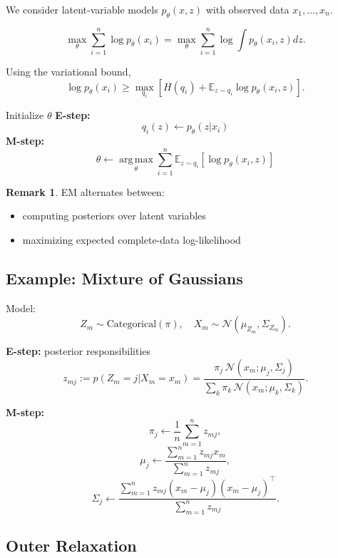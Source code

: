 \documentclass[12pt,oneside]{book}
\numberwithin{equation}{section}
\theoremstyle{definition}
\newtheorem{remark}{Remark}[section]
\theoremstyle{plain}
\theoremstyle{remark}
\newcommand{\E}{\mathbb{E}}
\newcommand{\argmax}{\operatorname*{arg\,max}}
\newcommand{\Normal}{\mathcal{N}}
\begin{document}
We consider latent-variable models $p_\theta(x,z)$ with observed data $x_1,\dots,x_n$.

\[
\max_\theta \sum_{i=1}^n \log p_\theta(x_i)
=
\max_\theta \sum_{i=1}^n \log \int p_\theta(x_i,z) dz.
\]

Using the variational bound,
\[
\log p_\theta(x_i)
\ge
\max_{q_i} \left[ H(q_i) + \E_{z \sim q_i} \log p_\theta(x_i,z) \right].
\]

\begin{algorithm}[H]
\caption{Expectation Maximization (EM)}
\begin{algorithmic}[1]
\State Initialize $\theta$
\Repeat
\State \textbf{E-step:} 
\[
q_i(z) \leftarrow p_\theta(z|x_i)
\]
\State \textbf{M-step:}
\[
\theta \leftarrow \argmax_\theta \sum_{i=1}^n \E_{z \sim q_i}[\log p_\theta(x_i,z)]
\]
\end{algorithmic}
\end{algorithm}

\begin{remark}
EM alternates between:
\begin{itemize}
    \item computing posteriors over latent variables
    \item maximizing expected complete-data log-likelihood
\end{itemize}
\end{remark}

\subsection{Example: Mixture of Gaussians}

Model:
\[
Z_m \sim \text{Categorical}(\pi), \quad X_m \sim \Normal(\mu_{Z_m}, \Sigma_{Z_m}).
\]

\textbf{E-step:} posterior responsibilities
\[
z_{mj} := p(Z_m = j | X_m = x_m)
=
\frac{\pi_j \, \mathcal{N}(x_m; \mu_j, \Sigma_j)}
{\sum_{k} \pi_k \, \mathcal{N}(x_m; \mu_k, \Sigma_k)}.
\]

\textbf{M-step:}
\[
\pi_j \leftarrow \frac{1}{n} \sum_{m=1}^n z_{mj},
\]
\[
\mu_j \leftarrow \frac{\sum_{m=1}^n z_{mj} x_m}{\sum_{m=1}^n z_{mj}},
\]
\[
\Sigma_j \leftarrow \frac{\sum_{m=1}^n z_{mj}(x_m - \mu_j)(x_m - \mu_j)^\top}{\sum_{m=1}^n z_{mj}}.
\]

\subsection{Outer Relaxation}
\end{document}
